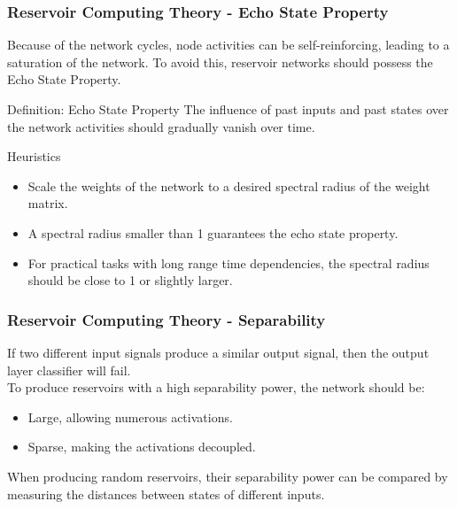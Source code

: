 \documentclass{beamer}
\begin{document}
\begin{frame}
\frametitle{Reservoir Computing Theory - Echo State Property}
Because of the network cycles, node activities can be self-reinforcing, leading to a saturation of the network. To avoid this, reservoir networks should possess the Echo State Property.
\begin{block}{Definition: Echo State Property}
The influence of past inputs and past states over the network activities should gradually vanish over time.
\end{block}
\begin{block}{Heuristics}
\begin{itemize}
\item Scale the weights of the network to a desired spectral radius of the weight matrix.
\item A spectral radius smaller than 1 guarantees the echo state property.
\item For practical tasks with long range time dependencies, the spectral radius should be close to 1 or slightly larger.
\end{itemize}
\end{block}

\end{frame}


\begin{frame}
\frametitle{Reservoir Computing Theory - Separability}
If two different input signals produce a similar output signal, then the output layer classifier will fail.\\
To produce reservoirs with a high separability power, the network should be:
\begin{itemize}
\item Large, allowing numerous activations.
\item Sparse, making the activations decoupled.
\end{itemize}
\vspace{0.8mm}
When producing random reservoirs, their separability power can be compared by measuring the distances between states of different inputs.
\end{frame}
\end{document}
